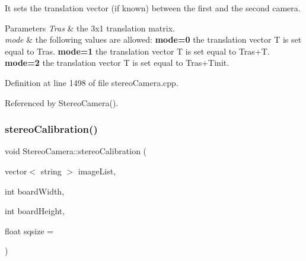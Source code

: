 It sets the translation vector (if known) between the first and the second camera. 


\begin{DoxyParams}{Parameters}
{\em Tras} & the 3x1 translation matrix. \\
\hline
{\em mode} & the following values are allowed\+: {\bfseries{mode=0}} the translation vector T is set equal to Tras. {\bfseries{mode=1}} the translation vector T is set equal to Tras+T. {\bfseries{mode=2}} the translation vector T is set equal to Tras+\+Tinit. \\
\hline
\end{DoxyParams}


Definition at line 1498 of file stereo\+Camera.\+cpp.


\begin{DoxyCode}{0}

\end{DoxyCode}


Referenced by Stereo\+Camera().

\mbox{\label{classStereoCamera_a398f45eeefe7979a834659cfbb7a6961}} 
\subsubsection{\texorpdfstring{stereoCalibration()}{stereoCalibration()}}
{\footnotesize\ttfamily void Stereo\+Camera\+::stereo\+Calibration (\begin{DoxyParamCaption}\item[{vector$<$ string $>$}]{image\+List,  }\item[{int}]{board\+Width,  }\item[{int}]{board\+Height,  }\item[{float}]{sqsize = {} }\end{DoxyParamCaption})}



